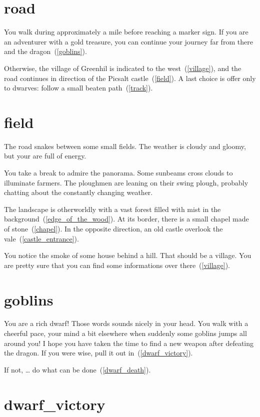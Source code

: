 \section{road}

You walk during approximately a mile before reaching a marker sign. If you are
an adventurer with a gold treasure, you can continue your journey far from there and
the dragon~(\ref{goblins}).

Otherwise, the village of Greenhil is indicated to the west~(\ref{village}), and
the road continues in direction of the Picsalt castle~(\ref{field}). A last
choice is offer only to dwarves: follow a small beaten path~(\ref{track}).

\section{field}

The road snakes between some small fields. The weather is cloudy and gloomy, but
your are full of energy.

You take a break to admire the panorama. Some sunbeams cross clouds to
illuminate farmers. The ploughmen are leaning on their swing plough, probably
chatting about the constantly changing weather.

The landscape is otherworldly with a vast forest filled with mist in the
background~(\ref{edge_of_the_wood}). At its border, there is a small chapel made
of stone~(\ref{chapel}). In the opposite direction, an old castle overlook the
vale~(\ref{castle_entrance}).

You notice the smoke of some house behind a hill. That should be a village. You
are pretty sure that you can find some informations over there~(\ref{village}).


\section{goblins}

You are a rich dwarf! Those words sounds nicely in your head. You walk with a
cheerful pace, your mind a bit elsewhere when suddenly some goblins jumps all
around you! I hope you have taken the time to find a new weapon after defeating
the dragon. If you were wise, pull it out in~(\ref{dwarf_victory}).

If not, … do what can be done~(\ref{dwarf_death}).

\section{dwarf_victory}

